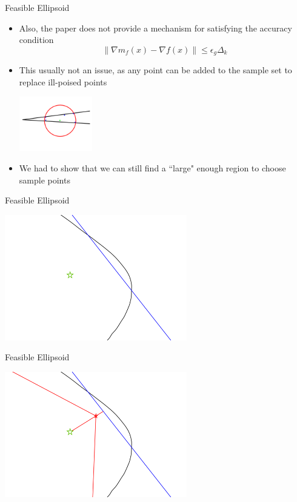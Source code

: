 \documentclass{beamer}
\newcommand{\dk}{{\Delta_k}}
\begin{document}
\begin{frame}{Feasible Ellipsoid}
	\begin{itemize}
		\item Also, the paper does not provide a mechanism for satisfying the accuracy condition
		\[\|\nabla m_f(x) - \nabla f(x)\| \le \epsilon_g \dk \]
		\item This usually not an issue, as any point can be added to the sample set to replace ill-poised points
		\begin{center}
			\includegraphics[width=120px]{images/impossible_poised.png}
		\end{center}
		\item We had to show that we can still find a ``large" enough region to choose sample points
	\end{itemize}
\end{frame}


\begin{frame}{Feasible Ellipsoid}
	\begin{center}
		\includegraphics[width=300px]{images/explanation_1.png}
	\end{center}
\end{frame}


\begin{frame}{Feasible Ellipsoid}
	\begin{center}
		\includegraphics[width=300px]{images/explanation_2.png}
	\end{center}
\end{frame}
\end{document}
